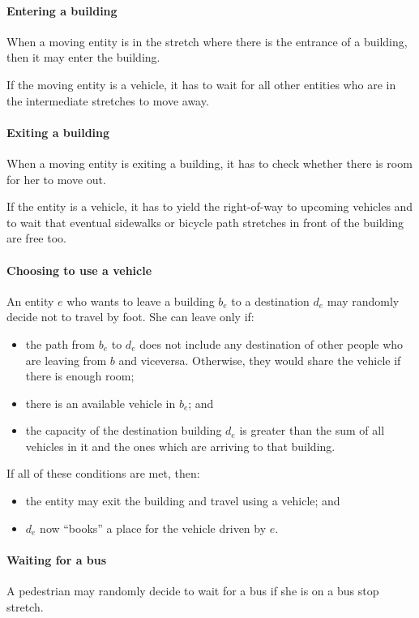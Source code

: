 \paragraph{Entering a building} When a moving entity is in the stretch where
there is the entrance of a building, then it may enter the building.

If the moving entity is a vehicle, it has to wait for all other entities who
are in the intermediate stretches to move away.

\paragraph{Exiting a building} When a moving entity is exiting a building, it
has to check whether there is room for her to move out.

If the entity is a vehicle, it has to yield the right-of-way to upcoming
vehicles and to wait that eventual sidewalks or bicycle path stretches in front
of the building are free too.

\paragraph{Choosing to use a vehicle} An entity $e$ who wants to leave a
building $b_e$ to a destination $d_e$ may randomly decide not to travel by
foot. She can leave only if:

\begin{itemize}
  \item the path from $b_e$ to $d_e$ does not include any destination of other
    people who are leaving from $b$ and viceversa. Otherwise, they would share
    the vehicle if there is enough room;
  \item there is an available vehicle in $b_e$; and
  \item the capacity of the destination building $d_e$ is greater than the sum
    of all vehicles in it and the ones which are arriving to that building.
\end{itemize}

If all of these conditions are met, then:
\begin{itemize}
  \item the entity may exit the building and travel using a vehicle; and
  \item $d_e$ now ``books'' a place for the vehicle driven by $e$.
\end{itemize}

\paragraph{Waiting for a bus} A pedestrian may randomly decide to wait for a
bus if she is on a bus stop stretch.

